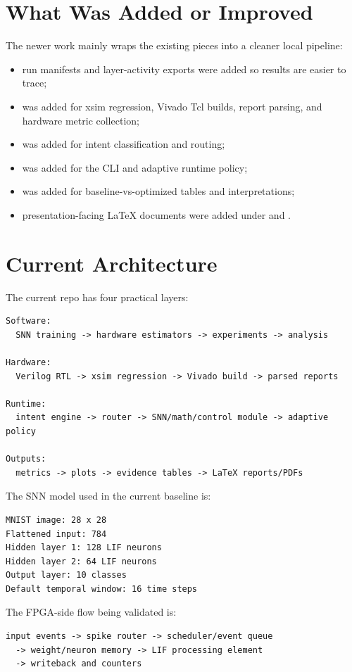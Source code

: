 \documentclass[11pt]{article}
\begin{document}
\section{What Was Added or Improved}
The newer work mainly wraps the existing pieces into a cleaner local pipeline:
\begin{itemize}[leftmargin=*]
\item run manifests and layer-activity exports were added so results are easier
to trace;
\item {} was added for xsim regression, Vivado Tcl
builds, report parsing, and hardware metric collection;
\item {} was added for intent classification and routing;
\item {} was added for the CLI and adaptive runtime policy;
\item {} was added for baseline-vs-optimized
tables and interpretations;
\item presentation-facing LaTeX documents were added under  and
.
\end{itemize}

\section{Current Architecture}
The current repo has four practical layers:
\begin{lstlisting}[style=plaincmd]
Software:
  SNN training -> hardware estimators -> experiments -> analysis

Hardware:
  Verilog RTL -> xsim regression -> Vivado build -> parsed reports

Runtime:
  intent engine -> router -> SNN/math/control module -> adaptive policy

Outputs:
  metrics -> plots -> evidence tables -> LaTeX reports/PDFs
\end{lstlisting}

The SNN model used in the current baseline is:
\begin{lstlisting}[style=plaincmd]
MNIST image: 28 x 28
Flattened input: 784
Hidden layer 1: 128 LIF neurons
Hidden layer 2: 64 LIF neurons
Output layer: 10 classes
Default temporal window: 16 time steps
\end{lstlisting}

The FPGA-side flow being validated is:
\begin{lstlisting}[style=plaincmd]
input events -> spike router -> scheduler/event queue
  -> weight/neuron memory -> LIF processing element
  -> writeback and counters
\end{lstlisting}
\end{document}
